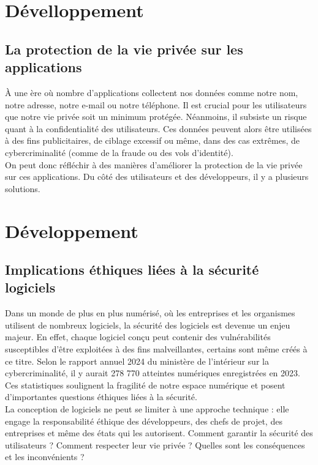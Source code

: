 \documentclass{article}
\begin{document}
\section{Dévelloppement}
\subsection{La protection de la vie privée sur les applications}
À une ère où nombre d'applications collectent nos données  comme notre nom, notre adresse, notre e-mail ou notre téléphone. Il est crucial pour les utilisateurs que notre vie privée soit un minimum protégée. Néanmoins, il subsiste un risque quant à la confidentialité des utilisateurs. Ces données peuvent alors être utilisées à des fins publicitaires, de ciblage excessif ou même, dans des cas extrêmes, de cybercriminalité (comme de la fraude ou des vols d'identité).\\
On peut donc réfléchir à des manières d'améliorer la protection de la vie privée sur ces applications. Du côté des utilisateurs et des développeurs, il y a plusieurs solutions.

\section{Développement}
\subsection{Implications éthiques liées à la sécurité  logiciels}
Dans un monde de plus en plus numérisé, où les entreprises et les organismes utilisent de
nombreux logiciels, la sécurité des logiciels est devenue un enjeu majeur. En effet, chaque
logiciel conçu peut contenir des vulnérabilités susceptibles d’être exploitées à des fins
malveillantes, certains sont même créés à ce titre. Selon le rapport annuel 2024 du ministère de
l’intérieur sur la cybercriminalité, il y aurait
278 770 atteintes numériques enregistrées en
2023. Ces statistiques soulignent la fragilité de notre espace numérique et posent
d'importantes questions éthiques liées à la sécurité.\\

La conception de logiciels ne peut se limiter à une approche technique : elle engage la
responsabilité éthique des développeurs, des chefs de projet, des entreprises et même des
états qui les autorisent. Comment garantir la sécurité des utilisateurs ? Comment respecter leur
vie privée ? Quelles sont les conséquences et les inconvénients ?\\
\end{document}
